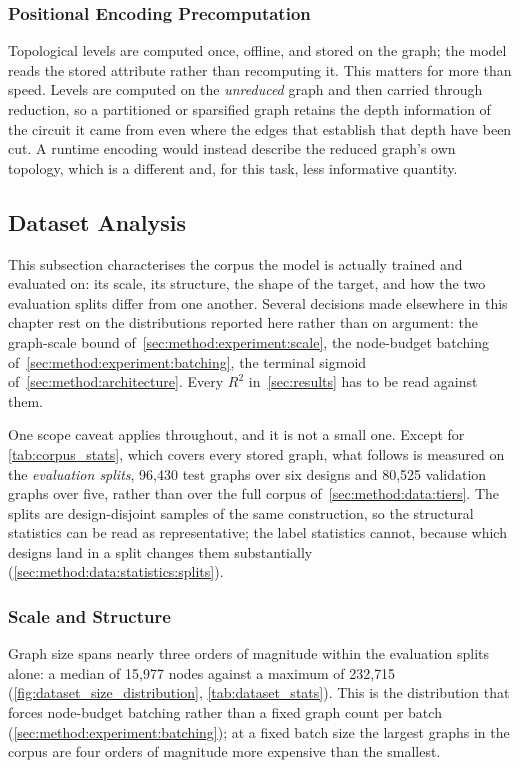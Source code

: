 \subsubsection{Positional Encoding Precomputation}
\label{sec:method:data:representation:pe}
Topological levels are computed once, offline, and stored on the graph; the model reads the
stored attribute rather than recomputing it. This matters for more than speed. Levels are
computed on the \emph{unreduced} graph and then carried through reduction, so a partitioned
or sparsified graph retains the depth information of the circuit it came from even where the
edges that establish that depth have been cut. A runtime encoding would instead describe the
reduced graph's own topology, which is a different and, for this task, less informative
quantity.

\subsection{Dataset Analysis}
\label{sec:method:data:statistics}
\providecommand{\resultsfigs}{media/results/figures}
\providecommand{\resultsgen}{media/results/tables}
This subsection characterises the corpus the model is actually trained and evaluated on: its
scale, its structure, the shape of the target, and how the two evaluation splits differ from
one another. Several decisions made elsewhere in this chapter rest on the distributions
reported here rather than on argument: the graph-scale bound
of~\ref{sec:method:experiment:scale}, the node-budget batching
of~\ref{sec:method:experiment:batching}, the terminal sigmoid
of~\ref{sec:method:architecture}. Every $R^2$ in~\ref{sec:results} has to be read
against them.

One scope caveat applies throughout, and it is not a small one. Except for
\ref{tab:corpus_stats}, which covers every stored graph, what follows is measured on the
\emph{evaluation splits}, 96{,}430 test graphs over six designs and 80{,}525
validation graphs over five, rather than over the full corpus
of~\ref{sec:method:data:tiers}. The splits are design-disjoint samples of the same
construction, so the structural statistics can be read as representative; the label
statistics cannot, because which designs land in a split changes them substantially
(\ref{sec:method:data:statistics:splits}).

\subsubsection{Scale and Structure}
\label{sec:method:data:statistics:scale}
Graph size spans nearly three orders of magnitude within the evaluation splits alone: a
median of 15{,}977 nodes against a maximum of 232{,}715
(\ref{fig:dataset_size_distribution}, \ref{tab:dataset_stats}). This is the distribution
that forces node-budget batching rather than a fixed graph count per batch
(\ref{sec:method:experiment:batching}); at a fixed batch size the largest graphs in the
corpus are four orders of magnitude more expensive than the smallest.

